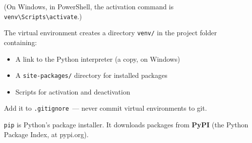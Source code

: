 \noindent{}(On Windows, in PowerShell, the activation command is \texttt{venv\textbackslash{}Scripts\textbackslash{}activate}.)

The virtual environment creates a directory \texttt{venv/} in the project folder containing:

\begin{itemize}
\tightlist
\item
  A link to the Python interpreter (a copy, on Windows)
\item
  A \texttt{site-packages/} directory for installed packages
\item
  Scripts for activation and deactivation
\end{itemize}

\noindent{}Add it to \texttt{.gitignore}~--- never commit virtual environments to git.

\begin{codebox}[short]

\begin{Shaded}
\begin{Highlighting}[]
\end{Highlighting}
\end{Shaded}

\end{codebox}

\label{44-appendices:a3-pip-installing-packages}

\texttt{pip} is Python's package installer. It downloads packages from \textbf{PyPI} (the Python Package Index, at pypi.org).

